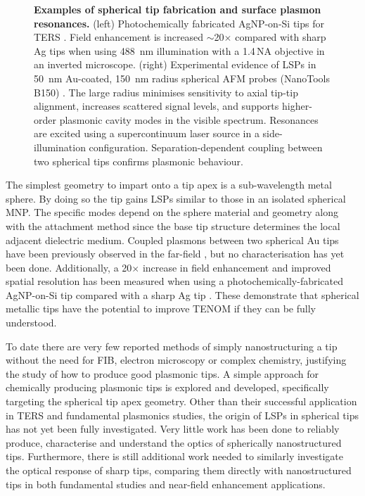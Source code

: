 \documentclass{article}
\begin{document}
\begin{figure}[bt]
\begin{subfigure}[t]{0.6\textwidth}
\end{subfigure}
\caption[Examples of spherical tip fabrication and surface plasmon resonances]{\textbf{Examples of spherical tip fabrication and surface plasmon resonances.} (left) Photochemically fabricated AgNP-on-Si tips for TERS \cite{umakoshi2012}. Field enhancement is increased $\sim$20$\times$ compared with sharp Ag tips when using \SI{488}{nm} illumination with a 1.4\,NA objective in an inverted microscope. (right) Experimental evidence of LSPs in \SI{50}{nm} Au-coated, \SI{150}{nm} radius spherical AFM probes (NanoTools B150) \cite{savage2012}. The large radius minimises sensitivity to axial tip-tip alignment, increases scattered signal levels, and supports higher-order plasmonic cavity modes in the visible spectrum. Resonances are excited using a supercontinuum laser source in a side-illumination configuration. Separation-dependent coupling between two spherical tips confirms plasmonic behaviour.}
\label{fig:savage2012a}
\end{figure}

The simplest geometry to impart onto a tip apex is a sub-wavelength metal sphere. By doing so the tip gains LSPs similar to those in an isolated spherical MNP. The specific modes depend on the sphere material and geometry along with the attachment method since the base tip structure determines the local adjacent dielectric medium. Coupled plasmons between two spherical Au tips have been previously observed in the far-field \cite{savage2012}, but no characterisation has yet been done. Additionally, a 20$\times$ increase in field enhancement and improved spatial resolution has been measured when using a photochemically-fabricated AgNP-on-Si tip compared with a sharp Ag tip \cite{umakoshi2012}. These demonstrate that spherical metallic tips have the potential to improve TENOM if they can be fully understood.

To date there are very few reported methods of simply nanostructuring a tip without the need for FIB, electron microscopy or complex chemistry, justifying the study of how to produce good plasmonic tips. A simple approach for chemically producing plasmonic tips is explored and developed, specifically targeting the spherical tip apex geometry. Other than their successful application in TERS and fundamental plasmonics studies, the origin of LSPs in spherical tips has not yet been fully investigated. Very little work has been done to reliably produce, characterise and understand the optics of spherically nanostructured tips. Furthermore, there is still additional work needed to similarly investigate the optical response of sharp tips, comparing them directly with nanostructured tips in both fundamental studies and near-field enhancement applications.
\end{document}
